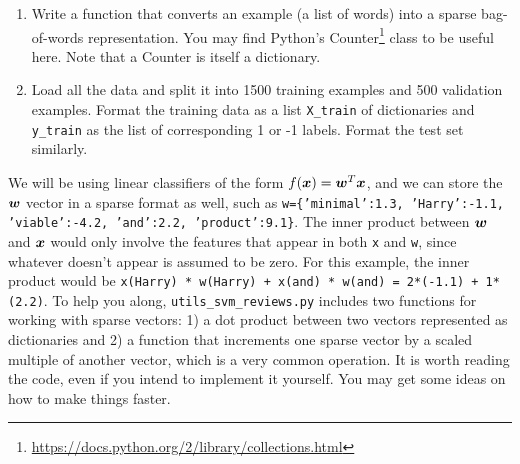 \documentclass{article}
\newcommand{\code}[1]{\texttt{#1}}
\theoremstyle{plain}
\theoremstyle{definition}
\begin{document}
\begin{enumerate}
  \setcounter{enumi}{\value{saveenum}}
\item Write a function that converts an example (a list of words) into
a sparse bag-of-words representation. You may find Python's Counter\footnote{\url{https://docs.python.org/2/library/collections.html}}
class to be useful here. Note that a Counter is itself a dictionary.
\item Load all the data and split it into 1500 training examples
and 500 validation examples. Format the training data as a list \code{X\_train} of dictionaries and \code{y\_train} as the list of corresponding 1 or -1 labels. Format the test set similarly.
\setcounter{saveenum}{\value{enumi}}
\end{enumerate}




We will be using linear classifiers of the form $f(\boldsymbol{x})=\boldsymbol{w}^{T} \boldsymbol{x}$, and
we can store the $\boldsymbol{w}$ vector in a sparse format as well, such as \code{w=\{'minimal':1.3, 'Harry':-1.1, 'viable':-4.2, 'and':2.2, 'product':9.1\}}.
The inner product between $\boldsymbol{w}$ and $\boldsymbol{x}$ would only involve the features
that appear in both \code{x} and \code{w}, since whatever doesn't
appear is assumed to be zero. For this example, the inner product
would be \code{x(Harry) {*} w(Harry) + x(and) {*} w(and) = 2{*}(-1.1)
+ 1{*}(2.2)}. To help you along, \code{utils\_svm\_reviews.py} includes two functions for working with
sparse vectors: 1) a dot product between two vectors represented as
dictionaries and 2) a function that increments one sparse vector by a scaled
multiple of another vector, which is a very common operation. It is
worth reading the code, even if you intend to implement it yourself.
You may get some ideas on how to make things faster. 
\end{document}
